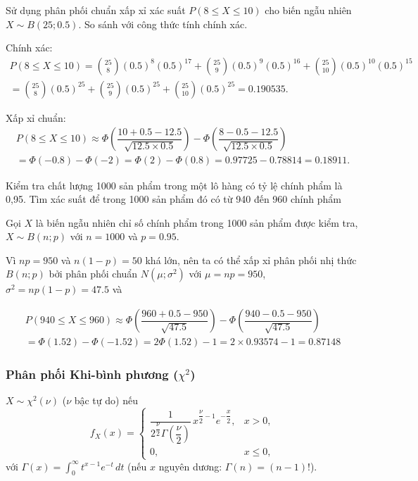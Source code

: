 \documentclass[12pt,a4paper]{article}
\begin{document}
\begin{vidu}[title={$B(25; 0.5)$, $P(8 \le X \le 10)$}]
Sử dụng phân phối chuẩn xấp xỉ xác suất $P(8 \le X \le 10)$ cho biến ngẫu nhiên $X \sim B(25; 0.5)$. So sánh với công thức tính chính xác.

Chính xác:
\begin{align*}
  P(8 \le X \le 10) = \binom{25}{8} (0.5)^{8} (0.5)^{17} + \binom{25}{9} (0.5)^{9} (0.5)^{16} + \binom{25}{10} (0.5)^{10} (0.5)^{15} \\ = \binom{25}{8} (0.5)^{25} + \binom{25}{9} (0.5)^{25} + \binom{25}{10} (0.5)^{25} = 0.190535.
\end{align*}

Xấp xỉ chuẩn:
\begin{align*}
  P(8 \le X \le 10) \approx \Phi\!\left(\dfrac{10 + 0.5 - 12.5}{\sqrt{12.5 \times 0.5}}\right) - \Phi\!\left(\dfrac{8 - 0.5 - 12.5}{\sqrt{12.5 \times 0.5}}\right) \\= \Phi(-0.8) - \Phi(-2) = \Phi(2) - \Phi(0.8) = 0.97725 - 0.78814 = 0.18911.
\end{align*}
\end{vidu}

\begin{vidu}[title={1000 sản phẩm, 95\% chính phẩm}]
Kiểm tra chất lượng 1000 sản phẩm trong một lô hàng có tỷ lệ chính phẩm là 0,95. Tìm xác suất để trong 1000 sản phẩm đó có từ 940 đến 960 chính phẩm

Gọi $X$ là biến ngẫu nhiên chỉ số chính phẩm trong 1000 sản phẩm được kiểm tra, $X \sim B(n; p)$ với $n = 1000$ và $p = 0.95$.

Vì $np = 950$ và $n(1 - p) = 50$ khá lớn, nên ta có thể xấp xỉ phân phối nhị thức $B(n; p)$ bởi phân phối chuẩn $N (\mu; \sigma^2)$ với $\mu = np = 950$, $\sigma^2 = np(1 - p) = 47.5$ và 

\begin{align*}
P(940 \le X \le 960) \approx \Phi\!\left(\dfrac{960 + 0.5 - 950}{\sqrt{47.5}}\right) - \Phi\!\left(\dfrac{940 - 0.5 - 950}{\sqrt{47.5}}\right) \\= \Phi(1.52) - \Phi(-1.52) = 2\Phi(1.52) - 1 = 2 \times 0.93574 - 1 = 0.87148
\end{align*}
\end{vidu}

\subsubsection{Phân phối Khi-bình phương ($\chi^2$)}

\begin{dinhnghia}
  $X \sim \chi^2(\nu)$ ($\nu$ bậc tự do) nếu
  \[
    f_X(x) = \begin{cases}
      \dfrac{1}{2^{\dfrac{\nu}{2}}\Gamma(\dfrac{\nu}{2})}\, x^{\dfrac{\nu}{2} - 1} e^{-\dfrac{x}{2}}, & x > 0, \\
      0, & x \le 0,
    \end{cases}
  \]
  với $\Gamma(x) = \displaystyle\int_0^{\infty} t^{x-1} e^{-t}\,dt$ (nếu $x$ nguyên dương: $\Gamma(n) = (n-1)!$).
\end{dinhnghia}
\end{document}
